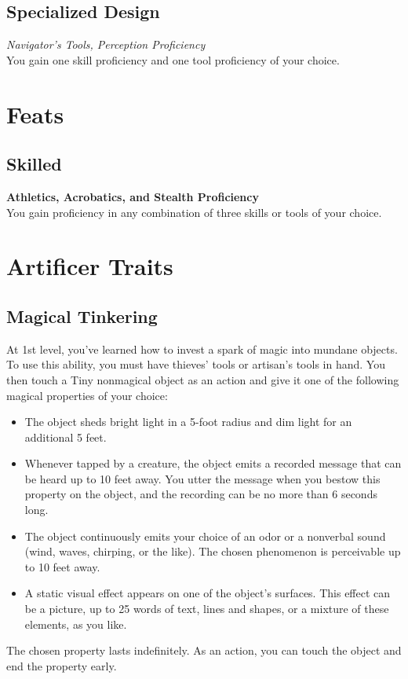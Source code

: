 \documentclass[letterpaper,openany,oneside,twocolumn]{book}
\begin{document}
\subsection*{Specialized Design}
\textit{Navigator's Tools, Perception Proficiency}\\
You gain one skill proficiency and one tool proficiency of your choice.

\section*{Feats}
\subsection*{Skilled}
\textbf{Athletics, Acrobatics, and Stealth Proficiency}\\
You gain proficiency in any combination of three skills or tools of your choice.


\section*{Artificer Traits}
\subsection*{Magical Tinkering}
At 1st level, you've learned how to invest a spark of magic into mundane objects. To use this ability, you must have thieves' tools or artisan's tools in hand. You then touch a Tiny nonmagical object as an action and give it one of the following magical properties of your choice:
\begin{itemize}
	\item The object sheds bright light in a 5-foot radius and dim light for an additional 5 feet.
	\item Whenever tapped by a creature, the object emits a recorded message that can be heard up to 10 feet away. You utter the message when you bestow this property on the object, and the recording can be no more than 6 seconds long.
	\item The object continuously emits your choice of an odor or a nonverbal sound (wind, waves, chirping, or the like). The chosen phenomenon is perceivable up to 10 feet away.
	\item A static visual effect appears on one of the object's surfaces. This effect can be a picture, up to 25 words of text, lines and shapes, or a mixture of these elements, as you like.
\end{itemize}
The chosen property lasts indefinitely. As an action, you can touch the object and end the property early.
\end{document}
